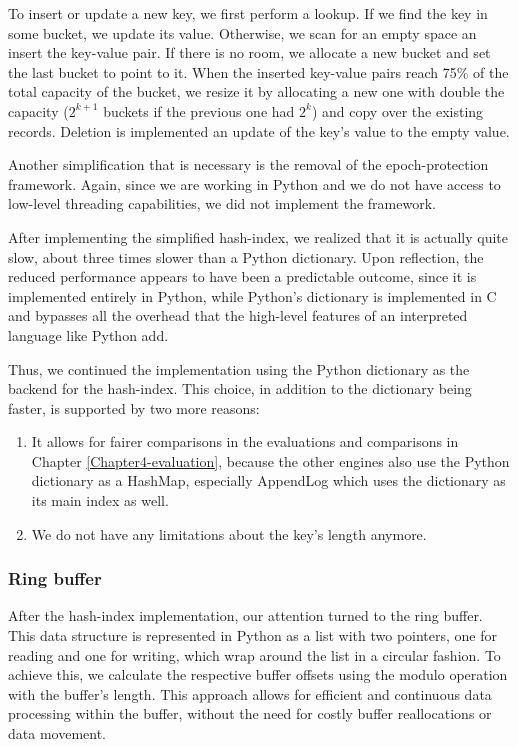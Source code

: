 To insert or update a new key, we first perform a lookup. If we find the key in some bucket, we update its value. Otherwise, we scan for an empty space an insert the key-value pair. If there is no room, we allocate a new bucket and set the last bucket to point to it. When the inserted key-value pairs reach 75\% of the total capacity of the bucket, we resize it by allocating a new one with double the capacity ($2^{k+1}$ buckets if the previous one had $2^{k}$) and copy over the existing records. Deletion is implemented an update of the key's value to the empty value.

Another simplification that is necessary is the removal of the epoch-protection framework. Again, since we are working in Python and we do not have access to low-level threading capabilities, we did not implement the framework.

After implementing the simplified hash-index, we realized that it is actually quite slow, about three times slower than a Python dictionary. Upon reflection, the reduced performance appears to have been a predictable outcome, since it is implemented entirely in Python, while Python's dictionary is implemented in C and bypasses all the overhead that the high-level features of an interpreted language like Python add.

Thus, we continued the implementation using the Python dictionary as the backend for the hash-index. This choice, in addition to the dictionary being faster, is supported by two more reasons:
\begin{enumerate}
    \item It allows for fairer comparisons in the evaluations and comparisons in Chapter \ref{Chapter4-evaluation}, because the other engines also use the Python dictionary as a HashMap, especially AppendLog which uses the dictionary as its main index as well.
    \item We do not have any limitations about the key's length anymore.
\end{enumerate}

\subsubsection{Ring buffer}

After the hash-index implementation, our attention turned to the ring buffer.
This data structure is represented in Python as a list with two pointers, one for reading and one for writing, which wrap around the list in a circular fashion.
To achieve this, we calculate the respective buffer offsets using the modulo operation with the buffer's length.
This approach allows for efficient and continuous data processing within the buffer, without the need for costly buffer reallocations or data movement.

